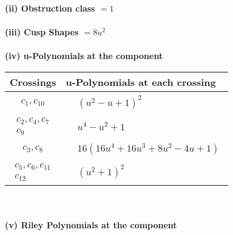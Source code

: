 \documentclass[1p]{elsarticle_modified}
\theoremstyle{definition}
\begin{document}
\flushleft \textbf{(ii) Obstruction class $= 1$}\\~\\
\flushleft \textbf{(iii) Cusp Shapes $= 8 u^2$}\\~\\
\newpage\renewcommand{\arraystretch}{1}
\flushleft \textbf{(iv) u-Polynomials at the component}\newline \\
\begin{tabular}{m{50pt}|m{274pt}}
Crossings & \hspace{64pt}u-Polynomials at each crossing \\
\hline $$\begin{aligned}c_{1},c_{10}\end{aligned}$$&$\begin{aligned}
&(u^2- u+1)^2
\end{aligned}$\\
\hline $$\begin{aligned}c_{2},c_{4},c_{7}\\c_{9}\end{aligned}$$&$\begin{aligned}
&u^4- u^2+1
\end{aligned}$\\
\hline $$\begin{aligned}c_{3},c_{8}\end{aligned}$$&$\begin{aligned}
&16(16 u^4+16 u^3+8 u^2-4 u+1)
\end{aligned}$\\
\hline $$\begin{aligned}c_{5},c_{6},c_{11}\\c_{12}\end{aligned}$$&$\begin{aligned}
&(u^2+1)^2
\end{aligned}$\\
\hline
\end{tabular}\\~\\
\newpage\renewcommand{\arraystretch}{1}
\flushleft \textbf{(v) Riley Polynomials at the component}\newline \\
\end{document}
